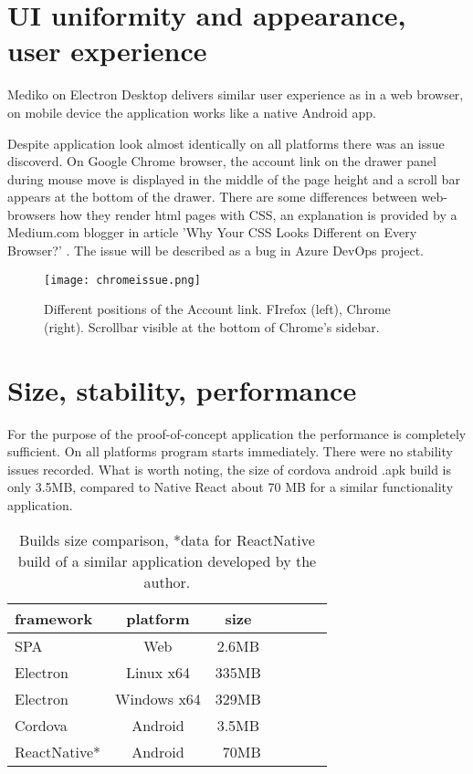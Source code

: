 \section{{UI uniformity and appearance, user experience}}%
\label{sec:appseveluation}
Mediko on Electron Desktop delivers similar user experience as in a web browser, on mobile device the application works like a native Android app.

Despite application look almost identically on all platforms there was an issue discoverd. On Google Chrome browser, the account link on the drawer panel during mouse move is displayed in the middle of the page height and a scroll bar appears at the bottom of the drawer. There are some differences between web-browsers how they render html pages with CSS, an explanation is provided by a Medium.com blogger in article 'Why Your CSS Looks Different on Every Browser?' \autocite{MediumCSS}. The issue will be described as a bug in Azure DevOps project.

\begin{figure}[H]
    \centering
    \texttt{[image: chromeissue.png]}
    \caption[CSS rendering issue]{\label{fig:chromeissue} Different positions of the Account link. FIrefox (left), Chrome (right). Scrollbar visible at the bottom of Chrome's sidebar.}
\end{figure}

\section{{Size, stability, performance}}%
\label{sec:appseveluation}
For the purpose of the proof-of-concept application the performance is completely sufficient. On all platforms program starts immediately. There were no stability issues recorded. What is worth noting, the size of cordova android .apk build is only 3.5MB, compared to Native React about 70 MB for a similar functionality application.

\begin{table}[H]
    \centering
    \begin{tabular}{lcccccc}
        \toprule
        framework & platform & size \\
        \midrule
        SPA  &  Web  &  2.6MB   \\
        Electron  &  Linux x64  &  335MB   \\
        Electron  &  Windows x64  &  329MB   \\
        Cordova  &  Android  &  3.5MB   \\
        ReactNative*  &  Android  &  ~70MB   \\

 
        \bottomrule
\end{tabular}
\caption[Builds size comparison]{\label{tab:electron}Builds size comparison, *data for ReactNative build of a similar application developed by the author.
}
\end{table}

